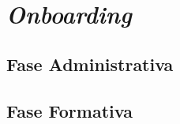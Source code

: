 \chapter{\textit{Onboarding}}
\label{cap3}

\section{Fase Administrativa}

\lipsum

\section{Fase Formativa}

\lipsum
